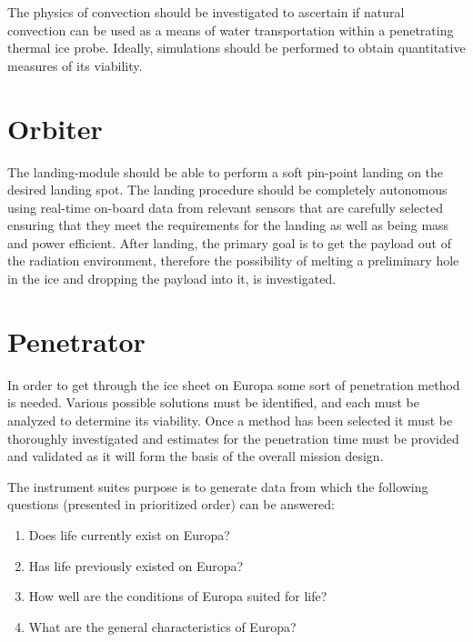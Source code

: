 The physics of convection should be investigated to ascertain if natural convection can be used as a means of water transportation within a penetrating thermal ice probe. Ideally, simulations should be performed to obtain quantitative measures of its viability.

\section{Orbiter}



The landing-module should be able to perform a soft pin-point landing on the desired landing spot. The landing procedure should be completely autonomous using real-time on-board data from relevant sensors that are carefully selected ensuring that they meet the requirements for the landing as well as being mass and power efficient. After landing, the primary goal is to get the payload out of the radiation environment, therefore the possibility of melting a preliminary hole in the ice and dropping the payload into it, is investigated.

\section{Penetrator}
In order to get through the ice sheet on Europa some sort of penetration method is needed. Various possible solutions must be identified, and each must be analyzed to determine its viability. Once a method has been selected it must be thoroughly investigated and estimates for the penetration time must be provided and validated as it will form the basis of the overall mission design.

The instrument suites purpose is to generate data from which the following questions (presented in prioritized order) can be answered:
\begin{enumerate}
    \item Does life currently exist on Europa?
    \item Has life previously existed on Europa?
    \item How well are the conditions of Europa suited for life?
    \item What are the general characteristics of Europa?
\end{enumerate}

